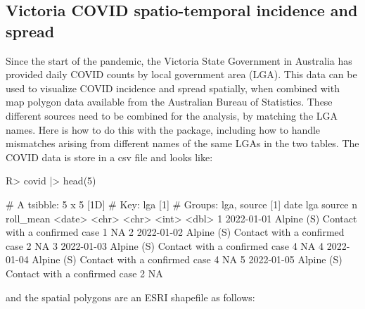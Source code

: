 \documentclass[
  shortnames]{jss}
\begin{document}
\hypertarget{covid}{%
\subsection{Victoria COVID spatio-temporal incidence and spread}\label{covid}}

Since the start of the pandemic, the Victoria State Government in Australia has provided daily COVID counts by local government area (LGA). This data can be used to visualize COVID incidence and spread spatially, when combined with map polygon data available from the Australian Bureau of Statistics. These different sources need to be combined for the analysis, by matching the LGA names. Here is how to do this with the  package, including how to handle mismatches arising from different names of the same LGAs in the two tables. The COVID data is store in a csv file and looks like:

\begin{CodeChunk}
\begin{CodeInput}
R> covid |> head(5)
\end{CodeInput}
\begin{CodeOutput}
# A tsibble: 5 x 5 [1D]
# Key:       lga [1]
# Groups:    lga, source [1]
  date       lga        source                            n roll_mean
  <date>     <chr>      <chr>                         <int>     <dbl>
1 2022-01-01 Alpine (S) Contact with a confirmed case     1        NA
2 2022-01-02 Alpine (S) Contact with a confirmed case     2        NA
3 2022-01-03 Alpine (S) Contact with a confirmed case     4        NA
4 2022-01-04 Alpine (S) Contact with a confirmed case     4        NA
5 2022-01-05 Alpine (S) Contact with a confirmed case     2        NA
\end{CodeOutput}
\end{CodeChunk}

and the spatial polygons are an ESRI shapefile as follows:
\end{document}
